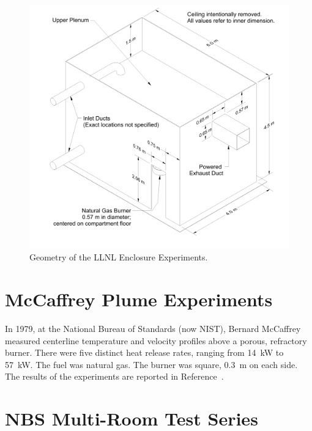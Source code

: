 \begin{figure}
\begin{center}
\includegraphics[height=6.in]{FIGURES/LLNL_Enclosure/LLNL_Enclosure_Drawing}
\end{center}
\caption[Geometry of the LLNL Enclosure Experiments]{Geometry of the LLNL Enclosure Experiments.}
\label{LLNL_Enclosure_Drawing}
\end{figure}

\clearpage

\section{McCaffrey Plume Experiments}

In 1979, at the National Bureau of Standards (now NIST), Bernard McCaffrey measured centerline temperature and velocity profiles above a porous, refractory burner.
There were five distinct heat release rates, ranging from 14~kW to 57~kW. The fuel was natural gas. The burner was square, 0.3~m on each side.
The results of the experiments are reported in Reference~\cite{McCaffrey:NBSIR_79-1910}.


\section{NBS Multi-Room Test Series}

